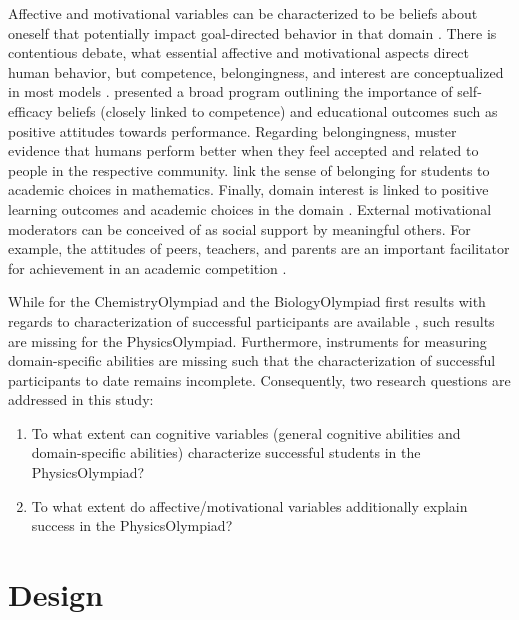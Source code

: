 \documentclass[]{interact}
\begin{document}
Affective and motivational variables can be characterized to be beliefs about oneself that potentially impact goal-directed behavior in that domain \citep{Rheinberg.2012}. There is contentious debate, what essential affective and motivational aspects direct human behavior, but competence, belongingness, and interest are conceptualized in most models \citep{Deci.2000,Hazari.2010}. \cite{Bandura.1997} presented a broad program outlining the importance of self-efficacy beliefs (closely linked to competence) and educational outcomes such as positive attitudes towards performance. Regarding belongingness, \cite{Baumeister.1995} muster evidence that humans perform better when they feel accepted and related to people in the respective community. \cite{Good.2012} link the sense of belonging for students to academic choices in mathematics. Finally, domain interest is linked to positive learning outcomes and academic choices in the domain \citep{Krapp.2002,Hazari.2010}. External motivational moderators can be conceived of as social support by meaningful others. For example, the attitudes of peers, teachers, and parents are an important facilitator for achievement in an academic competition \cite[e.g.,][]{Urhahne.2012}.

While for the ChemistryOlympiad and the BiologyOlympiad first results with regards to characterization of successful participants are available \citep{Urhahne.2012,Stang.2014}, such results are missing for the PhysicsOlympiad. Furthermore, instruments for measuring domain-specific abilities are missing such that the characterization of successful participants to date remains incomplete. Consequently, two research questions are addressed in this study:
\begin{enumerate}
\item To what extent can cognitive variables (general cognitive abilities and domain-specific abilities) characterize successful students in the PhysicsOlympiad?
\item To what extent do affective/motivational variables additionally explain success in the PhysicsOlympiad?
\end{enumerate}

\section{Design}
\end{document}
